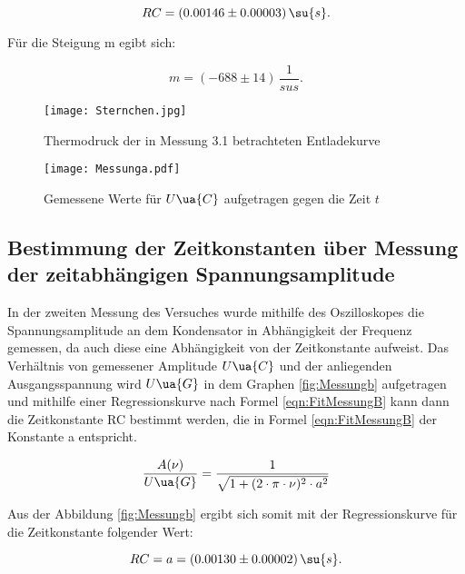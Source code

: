 \begin{equation}
  RC = (0.00146 \pm 0.00003) \, \su{s}.
\end{equation}

Für die Steigung m egibt sich:

\begin{equation}
  m = (-688 \pm 14) \, \frac{1}{su{s}}.
\end{equation}

\begin{figure}
  \centering
  \texttt{[image: Sternchen.jpg]}
  \caption{Thermodruck der in Messung 3.1 betrachteten Entladekurve }
  \label{fig:thermodruck}
\end{figure}

\begin{figure}
  \centering
  \texttt{[image: Messunga.pdf]}
  \caption{Gemessene Werte für $U\ua{C}$ aufgetragen gegen die Zeit $t$}
  \label{fig:Messunga}
\end{figure}


\newpage

\subsection{Bestimmung der Zeitkonstanten über Messung der zeitabhängigen Spannungsamplitude}

In der zweiten Messung des Versuches wurde mithilfe des Oszilloskopes die
Spannungsamplitude an dem Kondensator in Abhängigkeit der Frequenz gemessen,
da auch diese eine Abhängigkeit von der Zeitkonstante aufweist.
Das Verhältnis von gemessener Amplitude $U\ua{C}$ und der anliegenden
Ausgangsspannung wird $U\ua{G}$ in dem Graphen \ref{fig:Messungb} aufgetragen und
mithilfe einer Regressionskurve nach Formel \eqref{eqn:FitMessungB} kann dann
die Zeitkonstante RC bestimmt werden, die in Formel \eqref{eqn:FitMessungB} der
Konstante a entspricht.

\begin{equation}
  \frac{A(\nu)}{U\ua{G}} = \frac{1}{ \sqrt{ 1 + ( 2 \cdot \pi \cdot \nu )^2 \cdot a^2}}
  \label{eqn:FitMessungB}
\end{equation}

Aus der Abbildung \ref{fig:Messungb} ergibt sich somit mit der Regressionskurve
für die Zeitkonstante folgender Wert:

\begin{equation}
  RC = a = (0.00130 \pm 0.00002) \, \su{s} .
\end{equation}

